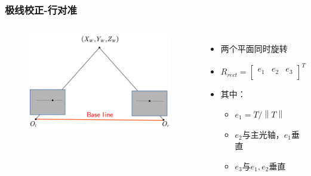 \documentclass[aspectratio=43]{beamer}
\begin{document}
		\begin{frame}
		\frametitle{极线校正-行对准}
		\begin{columns}
		\column{5cm}
		\begin{figure}
		\begin{center}
				\includegraphics[scale=0.5]{极线校正-行对准-旋转}
		\end{center}
		\end{figure}
		\column{5.5cm}
		\begin{itemize}
			\item 两个平面同时旋转
			\item $R_{rect}=\left[ \begin{matrix}
				e_1&		e_2&		e_3\\
			\end{matrix} \right] ^T$
			\item 其中：
			\vspace{0.2em}
				\begin{itemize}
					\item $e_1={{T}\big/{\left\| T \right\|}}$
					\item $e_2$与主光轴，$e_1$垂直
					\item $e_3$与$e_1,e_2$垂直
				\end{itemize}
		\end{itemize}
		\end{columns}
		\end{frame}	
	
\end{document}
